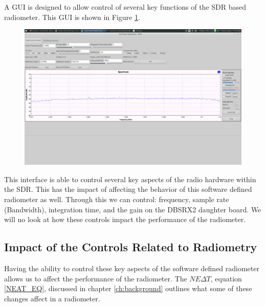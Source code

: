 
A GUI is designed to allow control of several key functions of the SDR based radiometer.  This GUI is shown in Figure \ref{radiometer_gui}. 

{\begin{figure}[h!tb] 
\centering
\includegraphics[width=17cm]{Images/radiometer_gui.png}
\label{radiometer_gui}
\end{figure}
}

This interface is able to control several key aspects of the radio hardware within the SDR.  This has the impact of affecting the behavior of this software defined radiometer as well.  Through this we can control: frequency, sample rate (Bandwidth), integration time, and the gain on the DBSRX2 daughter board.  We will no look at how these controls impact the performance of the radiometer.  

\subsection{Impact of the Controls Related to Radiometry}

Having the ability to control these key aspects of the software defined radiometer allows us to affect the performance of the radiometer.  The $NE\Delta T$, equation \ref{NEAT_EQ}, discussed in chapter \ref{ch:background} outlines what some of these changes affect in a radiometer.

